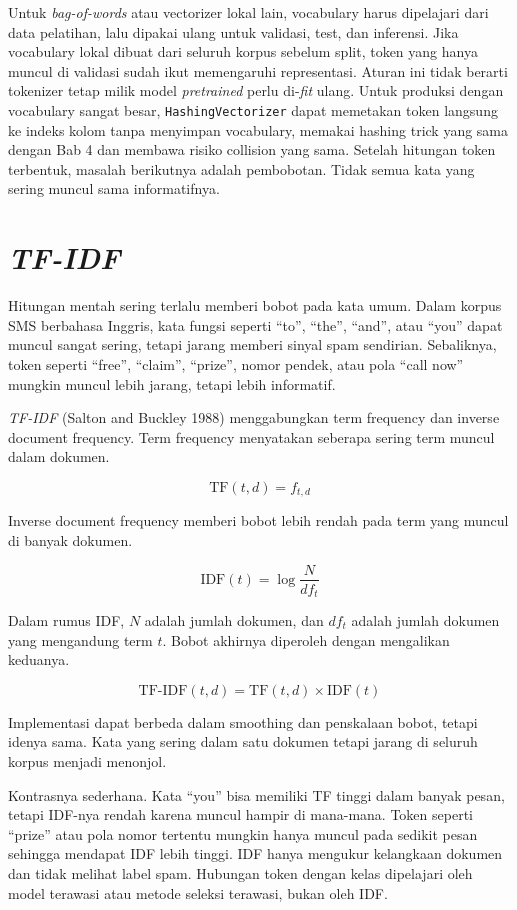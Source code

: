 Untuk \emph{bag-of-words} atau vectorizer lokal lain, vocabulary harus dipelajari dari data pelatihan, lalu dipakai ulang untuk validasi, test, dan inferensi. Jika vocabulary lokal dibuat dari seluruh korpus sebelum split, token yang hanya muncul di validasi sudah ikut memengaruhi representasi. Aturan ini tidak berarti tokenizer tetap milik model \emph{pretrained} perlu di-\emph{fit} ulang. Untuk produksi dengan vocabulary sangat besar, \passthrough{\lstinline!HashingVectorizer!} dapat memetakan token langsung ke indeks kolom tanpa menyimpan vocabulary, memakai hashing trick yang sama dengan Bab 4 dan membawa risiko collision yang sama. Setelah hitungan token terbentuk, masalah berikutnya adalah pembobotan. Tidak semua kata yang sering muncul sama informatifnya.

\section{\texorpdfstring{\emph{TF-IDF}}{TF-IDF}}\label{tf-idf}

Hitungan mentah sering terlalu memberi bobot pada kata umum. Dalam korpus SMS berbahasa Inggris, kata fungsi seperti ``to'', ``the'', ``and'', atau ``you'' dapat muncul sangat sering, tetapi jarang memberi sinyal spam sendirian. Sebaliknya, token seperti ``free'', ``claim'', ``prize'', nomor pendek, atau pola ``call now'' mungkin muncul lebih jarang, tetapi lebih informatif.

\emph{TF-IDF} (Salton and Buckley 1988) menggabungkan term frequency dan inverse document frequency. Term frequency menyatakan seberapa sering term muncul dalam dokumen.

\[
\text{TF}(t, d) = f_{t,d}
\]

Inverse document frequency memberi bobot lebih rendah pada term yang muncul di banyak dokumen.

\[
\text{IDF}(t) = \log \dfrac{N}{df_t}
\]

Dalam rumus IDF, \(N\) adalah jumlah dokumen, dan \(df_t\) adalah jumlah dokumen yang mengandung term \(t\). Bobot akhirnya diperoleh dengan mengalikan keduanya.

\[
\text{TF-IDF}(t, d) = \text{TF}(t, d) \times \text{IDF}(t)
\]

Implementasi dapat berbeda dalam smoothing dan penskalaan bobot, tetapi idenya sama. Kata yang sering dalam satu dokumen tetapi jarang di seluruh korpus menjadi menonjol.

Kontrasnya sederhana. Kata ``you'' bisa memiliki TF tinggi dalam banyak pesan, tetapi IDF-nya rendah karena muncul hampir di mana-mana. Token seperti ``prize'' atau pola nomor tertentu mungkin hanya muncul pada sedikit pesan sehingga mendapat IDF lebih tinggi. IDF hanya mengukur kelangkaan dokumen dan tidak melihat label spam. Hubungan token dengan kelas dipelajari oleh model terawasi atau metode seleksi terawasi, bukan oleh IDF.

